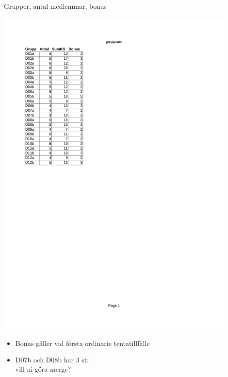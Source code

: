 

\ifkompendium\else


\begin{Slide}{Grupper, antal medlemmar, bonus}
\begin{multicols}{2}
\includegraphics[clip, trim=0cm 1cm 3.2cm 2.5cm, width=0.9\textwidth]{../img/bonus-2016.pdf}

\columnbreak

\begin{itemize}
\pause
\item Bonus gäller vid första ordinarie tentatillfälle 
\pause
\item D07b och D08b har 3 st; \\ vill ni göra merge?

\end{itemize}
\end{multicols}
\end{Slide}

